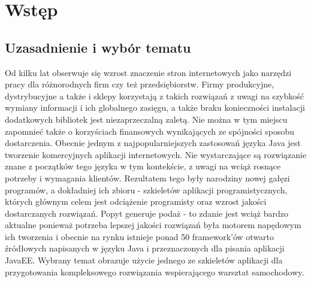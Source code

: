 \chapter{Wstęp}
\label{chaper:introduction}

\section{Uzasadnienie i wybór tematu}
	Od kilku lat obserwuje się wzrost znaczenie stron internetowych jako narzędzi pracy dla różnorodnych firm czy też przedsiębiorstw. Firmy produkcyjne, dystrybucyjne a także i sklepy korzystają z takich rozwiązań z uwagi na szybkość wymiany informacji i ich globalnego zasięgu, a także braku konieczności instalacji dodatkowych bibliotek jest niezaprzeczalną zaletą. Nie można w tym miejscu zapomnieć także o korzyściach finansowych wynikających ze spójności sposobu dostarczenia. 
	Obecnie jednym z najpopularniejszych zastosowań języka Java jest tworzenie komercyjnych aplikacji internetowych. Nie wystarczające są rozwiązanie znane z początków tego języka w tym kontekście, z uwagi na wciąż rosnące potrzeby i wymagania klientów. Rezultatem tego były narodziny nowej gałęzi programów, a dokładniej ich zbioru - szkieletów aplikacji programistycznych, których głównym celem jest odciążenie programisty oraz wzrost jakości dostarczanych rozwiązań. Popyt generuje podaż - to zdanie jest wciąż bardzo aktualne ponieważ potrzeba lepszej jakości rozwiązań była motorem napędowym ich tworzenia i obecnie na rynku istnieje ponad 50 framework'ów otwarto źródłowych napisanych w języku Java i przeznaczonych dla pisania aplikacji JavaEE. 
	Wybrany temat obrazuje użycie jednego ze szkieletów aplikacji dla przygotowania kompleksowego rozwiązania wspierającego warsztat samochodowy. 
